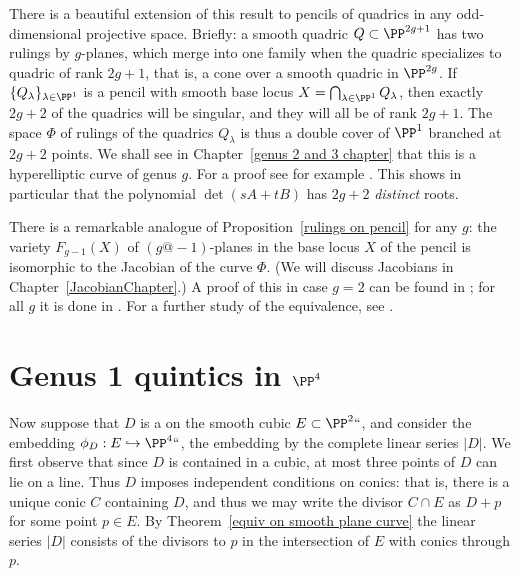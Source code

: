 \begin{fact}
There is a beautiful extension of this result to pencils of quadrics
in any odd-dimensional projective space. Briefly: a smooth quadric $Q
\subset \PP^{2g+1}$ has two rulings by $g$-planes, which merge into
one family when the quadric specializes to quadric of rank $2g+1$,
that is, a cone over a smooth quadric in $\PP^{2g}$. If
$\{Q_\lambda\}_{\lambda \in \PP^1}$ is a pencil with smooth base locus
$X = \bigcap_{\lambda \in \PP^1} Q_\lambda$, then exactly $2g+2$ of
the quadrics will be singular, and they will all be of rank $2g+1$.
The space $\Phi$ of rulings of the quadrics $Q_\lambda$ is thus a
double cover of $\PP^1$ branched at $2g+2$  points. We shall see in
Chapter~\ref{genus 2 and 3 chapter} that this 
%
is a
%
hyperelliptic curve of genus $g$. For a proof see for
example \cite[Proposition 22.34]{Harris1995}.
 This shows in particular that the polynomial $\det(sA+tB)$ has $2g+2$ \emph{distinct} roots. 

There is 
a remarkable analogue of Proposition~\ref{rulings on pencil} 
for any $g$: the variety $F_{g-1}(X)$ of $(g@{-}1)$-planes in
the base locus $X$ of the pencil is isomorphic to the 
%
Jacobian 
of the  curve $\Phi$. (We will discuss Jacobians in Chapter~\ref{JacobianChapter}.) A proof of this in case $g=2$ can be found in \cite{Griffiths-Harris1978}; for all $g$ it is done in \cite{Donagi}. For a further study of the equivalence, see \cite{Eisenbud-Schreyer}.
\end{fact}

\section{Genus 1 quintics in $\PP^4$} 
\label{g=1 in P4}\label{Genus 1 quintics in P4}

Now suppose that $D$ is a
on the smooth cubic $E\subset \PP^2` `$, and consider the embedding 
%
$\phi_D : E \hookrightarrow  \PP^4` `$, the embedding by the complete linear series $|D|$. We first observe that since $D$ is
contained in a cubic, at most three points of $D$ can lie on a line.
Thus $D$ imposes independent conditions on conics: that is, there is a
unique conic $C$ containing $D$,
and thus we may write the divisor $C\cap E$ as $D+p$ for some point $p\in E$. By Theorem~\ref{equiv on smooth plane curve} 
the linear series $|D|$ consists of the divisors 
%
to $p$ in the intersection of $E$ with conics through $p$.

